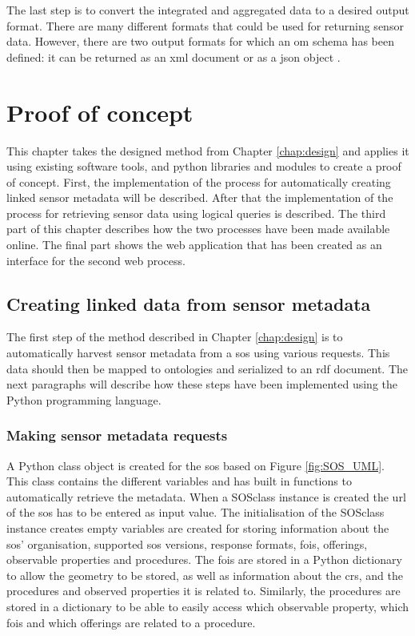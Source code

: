 The last step is to convert the integrated and aggregated data to a desired output format. There are many different formats that could be used for returning sensor data. However, there are two output formats for which an \ac{om} schema has been defined: it can be returned as an \ac{xml} document \citep{SW:ISO} or as a \ac{json} object \citep{SW:OGC6}.  


\chapter{Proof of concept}
\label{chap:impl}
This chapter takes the designed method from Chapter \ref{chap:design} and applies it using existing software tools, and python libraries and modules to create a proof of concept. First, the implementation of the process for automatically creating linked sensor metadata will be described. After that the implementation of the process for retrieving sensor data using logical queries is described. The third part of this chapter describes how the two processes have been made available online. The final part shows the web application that has been created as an interface for the second web process.



\section{Creating linked data from sensor metadata}
\label{par:linkedSD}
The first step of the method described in Chapter \ref{chap:design} is to automatically harvest sensor metadata from a \ac{sos} using various requests. This data should then be mapped to ontologies and serialized to an \ac{rdf} document. The next paragraphs will describe how these steps have been implemented using the Python programming language.

\subsection{Making sensor metadata requests}
A Python class object is created for the \ac{sos} based on Figure \ref{fig:SOS_UML}. This class contains the different variables and has built in functions to automatically retrieve the metadata. When a SOSclass instance is created the \ac{url} of the \ac{sos} has to be entered as input value. The initialisation of the SOSclass instance creates empty variables are created for storing information about the \ac{sos}' organisation, supported \ac{sos} versions, response formats, \acp{foi}, offerings, observable properties and procedures. The \acp{foi} are stored in a Python dictionary to allow the geometry to be stored, as well as information about the \ac{crs}, and the procedures and observed properties it is related to. Similarly, the procedures are stored in a dictionary to be able to easily access which observable property, which \acp{foi} and which offerings are related to a procedure.

